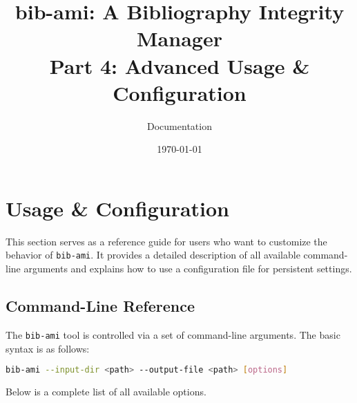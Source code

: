 \documentclass[11pt, a4paper]{article}
\title{\textbf{bib-ami}: A Bibliography Integrity Manager \\ \large Part 4: Advanced Usage \& Configuration}
\author{Documentation}
\date{\today}
\begin{document}
\maketitle
\tableofcontents
\newpage

\section{Usage \& Configuration}

This section serves as a reference guide for users who want to customize the behavior of \texttt{bib-ami}. It provides a detailed description of all available command-line arguments and explains how to use a configuration file for persistent settings.

\subsection{Command-Line Reference}

The \texttt{bib-ami} tool is controlled via a set of command-line arguments. The basic syntax is as follows:

\begin{lstlisting}[language=bash, caption={General syntax for bib-ami}]
bib-ami --input-dir <path> --output-file <path> [options]
\end{lstlisting}

Below is a complete list of all available options.
\end{document}
